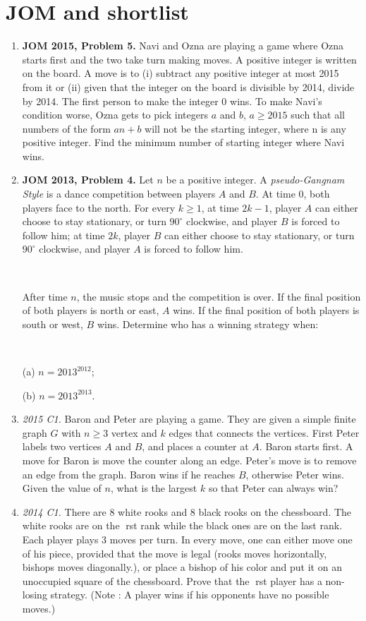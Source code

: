 \documentclass[11pt,a4paper]{article}
\begin{document}
\section {JOM and shortlist}
\begin{enumerate}
\item\textbf {JOM 2015, Problem 5.} Navi and Ozna are playing a game where Ozna starts first and the two take turn making moves. A positive integer is written on the board. A move is to (i) subtract any positive integer at most 2015 from it
or (ii) given that the integer on the board is divisible by 2014, divide by 2014. The first person to make the
integer 0 wins. To make Navi's condition worse, Ozna gets to pick integers $a$ and $b$, $a\ge 2015$ such that all
numbers of the form $an + b$ will not be the starting integer, where n is any positive integer.
Find the minimum number of starting integer where Navi wins.

\item\textbf {JOM 2013, Problem 4.} Let $n$ be a positive integer. A \emph{pseudo-Gangnam Style} is a dance competition between players $A$ and $B$. At time $0$, both players face to the north. For every $k\ge 1$, at time $2k-1$, player $A$ can either choose to stay stationary, or turn $90^{\circ}$ clockwise, and player $B$ is forced to follow him; at time $2k$, player $B$ can either choose to stay stationary, or turn $90^{\circ}$ clockwise, and player $A$ is forced to follow him.

\

After time $n$, the music stops and the competition is over. If the final position of both players is north or east, $A$ wins. If the final position of both players is south or west, $B$ wins. Determine who has a winning strategy when:

\

(a) $n=2013^{2012}$;

(b) $n=2013^{2013}$.

\item\emph {2015 C1.} Baron and Peter are playing a game. They are given a simple finite graph $G$ with $n\ge 3$ vertex and $k$
edges that connects the vertices. First Peter labels two vertices $A$ and $B$, and places a counter at $A$. Baron
starts first. A move for Baron is move the counter along an edge. Peter's move is to remove an edge from
the graph. Baron wins if he reaches $B$, otherwise Peter wins.
Given the value of $n$, what is the largest $k$ so that Peter can always win?

\item\emph {2014 C1.} There are 8 white rooks and 8 black rooks on the chessboard. The white rooks are on the rst rank
while the black ones are on the last rank. Each player plays 3 moves per turn. In every move, one can
either move one of his piece, provided that the move is legal (rooks moves horizontally, bishops moves
diagonally.), or place a bishop of his color and put it on an unoccupied square of the chessboard. Prove
that the rst player has a non-losing strategy. (Note : A player wins if his opponents have no possible
moves.)


\end{enumerate}
\end{document}
